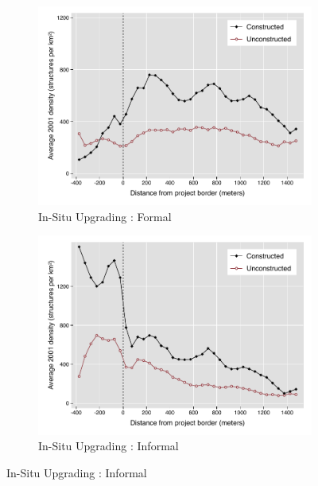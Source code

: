 \documentclass[12pt]{article}
\begin{document}
\begin{figure}
        \begin{subfigure}[b]{0.495\textwidth}
            \centering
        \caption{In-Situ Upgrading : Formal}
            \includegraphics[width=\textwidth,trim={0.3cm .3cm 0.1cm 0cm}, clip=true]{figures/bblu_for_pre_means_4_2.pdf}
        \end{subfigure}
        \hfill
        \begin{subfigure}[b]{0.495\textwidth}
            \centering
        \caption{In-Situ Upgrading : Informal}
            \includegraphics[width=\textwidth,trim={0.3cm .3cm 0.1cm 0cm}, clip=true]{figures/bblu_inf_pre_means_4_2.pdf}

\end{subfigure}
\end{figure}
\end{document}
